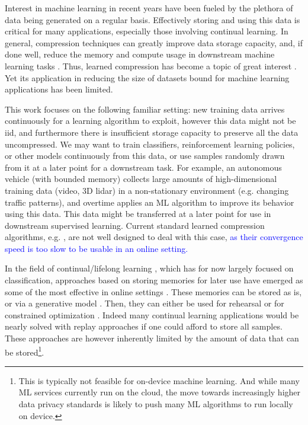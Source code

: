 \documentclass[colorinlistoftodos]{article} %
\newcommand\mynotesLC[1]{\textcolor{blue}{#1}}
\begin{document}
Interest in machine learning in recent years have been fueled by the plethora of data being generated on a regular basis. Effectively storing and using this data is critical for many applications, especially those involving continual learning. In general, compression techniques can greatly improve data storage capacity, and, if done well, reduce the memory and compute usage in downstream machine learning tasks \citep{JPEG,Oyallon_2018_ECCV}. Thus, learned compression has become a topic of great interest \citep{theis2017lossy,balle2016end,johnston2018improved}. Yet its application in reducing the size of datasets bound for machine learning applications has been limited.

This work focuses on the following familiar setting: new training data arrives continuously for a learning algorithm to exploit, however this data might not be iid, and furthermore there is insufficient storage capacity to preserve all the data uncompressed. We may want to train classifiers, reinforcement learning policies, or other models continuously from this data, or use samples randomly drawn from it at a later point for a downstream task. For example, an autonomous vehicle (with bounded memory) collects large amounts of high-dimensional training data (video, 3D lidar) in a non-stationary environment (e.g. changing traffic patterns), and overtime applies an ML algorithm to improve its behavior using this data. This data might be transferred at a later point for use in downstream supervised learning. Current standard learned compression algorithms, e.g. \cite{torfason2018towards}, are not well designed to deal with this case,  \mynotesLC{as their convergence speed is too slow to be usable in an online setting.}

In the field of continual/lifelong learning \citep{thrun1995lifelong}, which has for now largely focused on classification, approaches based on storing memories for later use have emerged as some of the most effective in online settings \citep{lopez2017gradient,aljundi2018Online,chaudhry2018efficient,chaudhry2019continual,aljundi2019online}. These memories can be stored as is, or via a generative model \citep{shin2017continual}. Then, they can either be used for rehearsal \citep{chaudhry2019continual,aljundi2019online} or for constrained optimization \cite{lopez2017gradient,chaudhry2018efficient,aljundi2018Online}.
Indeed many continual learning applications would be nearly solved with replay approaches if one could afford to store all samples. These approaches are however inherently limited by the amount of data that can be stored\footnote{This is typically not feasible for on-device machine learning. And while many ML services currently run on the cloud, the move towards increasingly higher data privacy standards is likely to push many ML algorithms to run locally on device.}.
\end{document}
